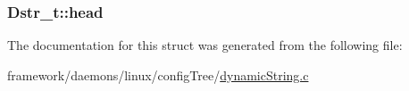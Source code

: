 \subsubsection[{\texorpdfstring{head}{head}}]{ Dstr\+\_\+t\+::head}\hypertarget{struct_dstr__t_a9c34dd3e9c4477f2a6292d4f15d3df86}{}\label{struct_dstr__t_a9c34dd3e9c4477f2a6292d4f15d3df86}


The documentation for this struct was generated from the following file\+:\begin{DoxyCompactItemize}
\item 
framework/daemons/linux/config\+Tree/\hyperlink{dynamic_string_8c}{dynamic\+String.\+c}\end{DoxyCompactItemize}
